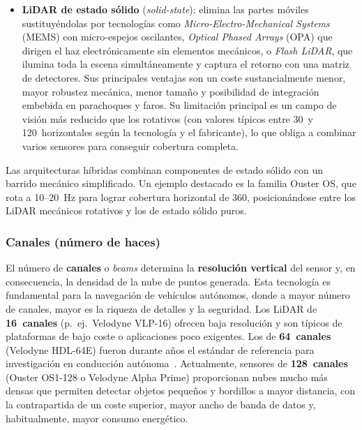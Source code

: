 \begin{itemize}
    \item \textbf{LiDAR de estado sólido} (\textit{solid-state}):
    elimina las partes móviles sustituyéndolas por tecnologías como
    \textit{Micro-Electro-Mechanical Systems} (MEMS) con micro-espejos
    oscilantes, \textit{Optical Phased Arrays} (OPA) que dirigen el haz
    electrónicamente sin elementos mecánicos, o \textit{Flash LiDAR},
    que ilumina toda la escena simultáneamente y captura el retorno con
    una matriz de detectores. Sus principales ventajas son un coste
    sustancialmente menor, mayor robustez mecánica, menor tamaño y
    posibilidad de integración embebida en parachoques y faros. Su
    limitación principal es un campo de visión más reducido que los
    rotativos (con valores típicos entre 30\textdegree\ y
    120\textdegree\ horizontales según la tecnología y el fabricante),
    lo que obliga a combinar varios sensores para conseguir cobertura
    completa.
\end{itemize}

Las arquitecturas híbridas combinan componentes de estado sólido con un
barrido mecánico simplificado. Un ejemplo destacado es la familia
Ouster OS, que rota a 10--20~Hz para lograr cobertura horizontal de
360\textdegree, posicionándose entre los LiDAR mecánicos rotativos y
los de estado sólido puros.

\subsubsection{Canales (número de haces)}
\label{sec:lidar-canales}

El número de \textbf{canales} o \textit{beams} determina la
\textbf{resolución vertical} del sensor y, en consecuencia, la densidad
de la nube de puntos generada. Esta tecnología es fundamental para la
navegación de vehículos autónomos, donde a mayor número de canales,
mayor es la riqueza de detalles y la seguridad. Los LiDAR de
\textbf{16~canales} (p.~ej.\ Velodyne VLP-16) ofrecen baja resolución y
son típicos de plataformas de bajo coste o aplicaciones poco exigentes.
Los de \textbf{64~canales} (Velodyne HDL-64E) fueron durante años el
estándar de referencia para investigación en conducción
autónoma~\cite{geiger2012kitti}. Actualmente, sensores de
\textbf{128~canales} (Ouster OS1-128 o Velodyne Alpha Prime)
proporcionan nubes mucho más densas que permiten detectar objetos
pequeños y bordillos a mayor distancia, con la contrapartida de un
coste superior, mayor ancho de banda de datos y, habitualmente, mayor
consumo energético.

